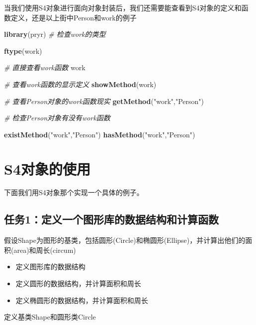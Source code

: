 \documentclass[]{book}
\newenvironment{Shaded}{\begin{snugshade}}{\end{snugshade}}
\newcommand{\KeywordTok}[1]{\textcolor[rgb]{0.13,0.29,0.53}{\textbf{#1}}}
\newcommand{\StringTok}[1]{\textcolor[rgb]{0.31,0.60,0.02}{#1}}
\newcommand{\CommentTok}[1]{\textcolor[rgb]{0.56,0.35,0.01}{\textit{#1}}}
\newcommand{\NormalTok}[1]{#1}
\begin{document}
当我们使用S4对象进行面向对象封装后，我们还需要能查看到S4对象的定义和函数定义，还是以上街中Person和work的例子

\begin{Shaded}
\begin{Highlighting}[]
\KeywordTok{library}\NormalTok{(pryr)}
\CommentTok{# 检查work的类型}

\KeywordTok{ftype}\NormalTok{(work)}

\CommentTok{# 直接查看work函数}
\NormalTok{work}

\CommentTok{# 查看work函数的显示定义}
\KeywordTok{showMethod}\NormalTok{(work)}

\CommentTok{# 查看Person对象的work函数现实}
\KeywordTok{getMethod}\NormalTok{(}\StringTok{"work"}\NormalTok{,}\StringTok{"Person"}\NormalTok{)}

\CommentTok{# 检查Person对象有没有work函数}

\KeywordTok{existMethod}\NormalTok{(}\StringTok{"work"}\NormalTok{,}\StringTok{"Person"}\NormalTok{)}
\KeywordTok{hasMethod}\NormalTok{(}\StringTok{"work"}\NormalTok{,}\StringTok{"Person"}\NormalTok{)}
\end{Highlighting}
\end{Shaded}

\section{S4对象的使用}\label{s4}

下面我们用S4对象那个实现一个具体的例子。

\subsection{任务1：定义一个图形库的数据结构和计算函数}\label{1}

假设Shape为图形的基类，包括圆形(Circle)和椭圆形(Ellipse)，并计算出他们的面积(area)和周长(circum)

\begin{itemize}
\item
  定义图形库的数据结构
\item
  定义圆形的数据结构，并计算面积和周长
\item
  定义椭圆形的数据结构，并计算面积和周长
\end{itemize}

定义基类Shape和圆形类Circle
\end{document}
